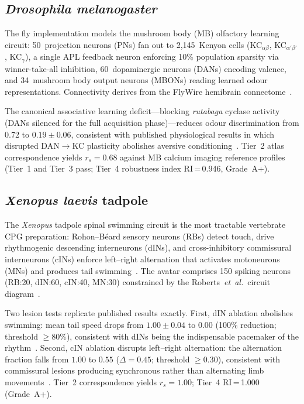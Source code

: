 \documentclass[12pt,a4paper]{article}
\begin{document}
\subsection*{\textit{Drosophila melanogaster}}

The fly implementation models the mushroom body (MB) olfactory learning
circuit: 50~projection neurons (PNs) fan out to 2,145~Kenyon cells
(KC$_{\alpha\beta}$, KC$_{\alpha'\beta'}$, KC$_\gamma$), a single APL
feedback neuron enforcing 10\% population sparsity via winner-take-all
inhibition, 60~dopaminergic neurons (DANs) encoding valence, and
34~mushroom body output neurons (MBONs) reading learned odour
representations.
Connectivity derives from the FlyWire hemibrain
connectome~\cite{dorkenwald2024}.

The canonical associative learning deficit---blocking
\textit{rutabaga} cyclase activity (DANs silenced for the full
acquisition phase)---reduces odour discrimination from 0.72 to
$0.19 \pm 0.06$, consistent with published physiological results in
which disrupted DAN$\to$KC plasticity abolishes aversive
conditioning~\cite{lin2014}.
Tier~2 atlas correspondence yields $r_s = 0.68$ against MB calcium
imaging reference profiles (Tier~1 and Tier~3 pass; Tier~4 robustness
index RI\,=\,0.946, Grade~A+).

\subsection*{\textit{Xenopus laevis} tadpole}

The \textit{Xenopus} tadpole spinal swimming circuit is the most
tractable vertebrate CPG preparation: Rohon--B\'{e}ard sensory neurons
(RBs) detect touch, drive rhythmogenic descending interneurons (dINs),
and cross-inhibitory commissural interneurons (cINs) enforce left--right
alternation that activates motoneurons (MNs) and produces tail
swimming~\cite{roberts1998,li2006}.
The avatar comprises 150 spiking neurons (RB:20, dIN:60, cIN:40,
MN:30) constrained by the Roberts~\textit{et~al.}\ circuit
diagram~\cite{roberts1998}.

Two lesion tests replicate published results exactly.
First, dIN ablation abolishes swimming: mean tail speed drops from
$1.00 \pm 0.04$ to $0.00$ (100\% reduction; threshold $\geq$80\%),
consistent with dINs being the indispensable pacemaker of the
rhythm~\cite{li2006}.
Second, cIN ablation disrupts left--right alternation: the
alternation fraction falls from $1.00$ to $0.55$ ($\Delta = 0.45$;
threshold $\geq$0.30), consistent with commissural lesions producing
synchronous rather than alternating limb movements~\cite{roberts1998}.
Tier~2 correspondence yields $r_s = 1.00$; Tier~4 RI\,=\,1.000
(Grade~A+).
\end{document}
